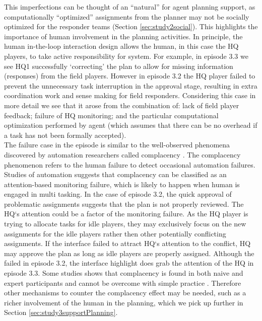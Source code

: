 This imperfections can be thought of an ``natural'' for agent planning support, as computationally ``optimized'' assignments from the planner may not be socially optimized for the responder teams (Section \ref{sec:study2social}). This highlights the importance of human involvement in the planning activities. In principle, the human in-the-loop interaction design allows the human, in this case the HQ players, to take active responsibility for system. For example, in episode 3.3 we see HQ1 successfully `correcting' the plan to allow for missing information (responses) from the field players. However in episode 3.2 the HQ player failed to prevent the unnecessary task interruption in the approval stage, resulting in extra coordination work and sense making for field responders. Considering this case in more detail we see that it arose from the combination of: lack of field player feedback; failure of HQ monitoring; and the particular computational optimization performed by agent (which assumes that there can be no overhead if a task has not been formally accepted).\\

The failure case in the episode is similar to the well-observed phenomena discovered by automation researchers called complacency \citep{Kaber1997}. The complacency phenomenon refers to the human failure to detect occasional automation failures. Studies of automation suggests that complacency can be classified as an attention-based monitoring failure, which is likely to happen when human is engaged in multi tasking. In the case of episode 3.2, the quick approval of problematic assignments suggests that the plan is not properly reviewed. The HQ`s attention could be a factor of the monitoring failure. As the HQ player is trying to allocate tasks for idle players, they may exclusively focus on the new assignments for the idle players rather then other potentially conflicting assignments.  If the interface failed to attract HQ`s attention to the conflict, HQ may approve the plan as long as idle players are properly assigned. Although the failed in episode 3.2, the interface highlight does grab the attention of the HQ in episode 3.3. Some studies shows that complacency is found in both naive and expert participants and cannot be overcome with simple practice \citep{Parasuraman2010}. Therefore other mechanisms to counter the complacency effect may be needed, such as a richer involvement of the human in the planning, which we pick up further in Section \ref{sec:study3supportPlanning}.\\

